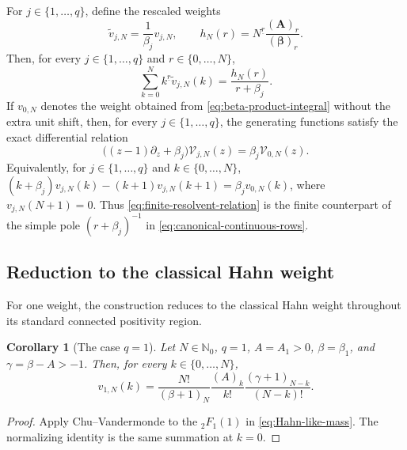 \documentclass[10pt]{amsart}
\newcommand{\Nzero}{\mathbb N_0}
\newcommand{\A}{\boldsymbol A}
\newcommand{\bbeta}{\boldsymbol\beta}
\newcommand{\fall}[2]{#1^{\underline{#2}}}
\theoremstyle{plain}
\newtheorem{corollary}[theorem]{Corollary}
\theoremstyle{definition}
\theoremstyle{remark}
\begin{document}
For \(j\in\{1,\ldots,q\}\), define the rescaled weights
\begin{equation}
 \widetilde v_{j,N}=\frac1{\beta_j}v_{j,N},
 \qquad
 h_N(r)=\fall{N}{r}\frac{(\A)_r}{(\bbeta)_r}.
 \label{eq:canonical-finite-row}
\end{equation}
Then, for every \(j\in\{1,\ldots,q\}\) and
\(r\in\{0,\ldots,N\}\),
\begin{equation}
 \sum_{k=0}^N\fall{k}{r}\widetilde v_{j,N}(k)
 =\frac{h_N(r)}{r+\beta_j}.
 \label{eq:resolvent-factorial-moment}
\end{equation}
If \(v_{0,N}\) denotes the weight obtained from
\eqref{eq:beta-product-integral} without the extra unit shift, then, for
every \(j\in\{1,\ldots,q\}\), the generating functions satisfy the exact
differential relation
\begin{equation}
 \bigl((z-1)\partial_z+\beta_j\bigr)\mathcal V_{j,N}(z)
 =\beta_j\mathcal V_{0,N}(z).
 \label{eq:finite-resolvent-relation}
\end{equation}
Equivalently, for \(j\in\{1,\ldots,q\}\) and
\(k\in\{0,\ldots,N\}\),
\((k+\beta_j)v_{j,N}(k)-(k+1)v_{j,N}(k+1)
=\beta_jv_{0,N}(k)\), where \(v_{j,N}(N+1)=0\).
Thus \eqref{eq:finite-resolvent-relation} is the finite counterpart of the simple pole
\((r+\beta_j)^{-1}\) in \eqref{eq:canonical-continuous-rows}.

\subsection{Reduction to the classical Hahn weight}

For one weight, the construction reduces to the classical Hahn weight
throughout its standard connected positivity region.

\begin{corollary}[The case \(q=1\)]
\label{cor:q1-Hahn-weight}
Let \(N\in\Nzero\), \(q=1\), \(A=A_1>0\), \(\beta=\beta_1\), and
\(\gamma=\beta-A>-1\). Then, for every
\(k\in\{0,\ldots,N\}\),
\begin{equation}
 v_{1,N}(k)=
 \frac{N!}{(\beta+1)_N}
 \frac{(A)_k}{k!}
 \frac{(\gamma+1)_{N-k}}{(N-k)!}.
 \label{eq:exact-Hahn-weight}
\end{equation}
\end{corollary}

\begin{proof}
Apply Chu--Vandermonde to the \({}_2F_1(1)\) in
\eqref{eq:Hahn-like-mass}. The normalizing identity is the same summation
at \(k=0\).
\end{proof}
\end{document}
